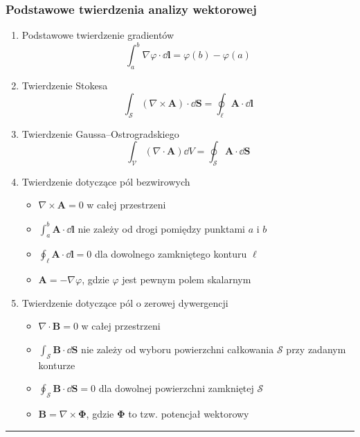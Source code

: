 \documentclass[../main.tex]{subfiles}
\begin{document}
\subsubsection*{Podstawowe twierdzenia analizy wektorowej}
\begin{enumerate}
    \item Podstawowe twierdzenie gradientów
    \begin{equation*}
        \int_a^b\nabla\varphi\cdot\dd{\mathbf{l}}=\varphi(b)-\varphi(a)
    \end{equation*}
    
    \item Twierdzenie Stokesa
    \begin{equation*}
        \int_\mathcal{S}(\nabla\times\mathbf{A})\cdot \dd{\mathbf{S}}=\oint_\ell \mathbf{A}\cdot\dd{\mathbf{l}}
    \end{equation*}
    
    \item Twierdzenie Gaussa--Ostrogradskiego
    \begin{equation*}
        \int_\mathcal{V}(\nabla\cdot \mathbf{A})\dd{V}=\oint_\mathcal{S}\mathbf{A}\cdot\dd{\mathbf{S}}
    \end{equation*}
    
    \item Twierdzenie dotyczące pól bezwirowych
    \begin{itemize}
        \item \(\nabla\times\mathbf{A}=0\) w całej przestrzeni
        \item \(\int_a^b\mathbf{A}\cdot\dd{\mathbf{l}}\) nie zależy od drogi pomiędzy punktami \(a\)
        i \(b\)
        \item \(\oint_\ell \mathbf{A}\cdot\dd{\mathbf{l}}=0\) dla dowolnego zamkniętego konturu
        \(\ell\)
        \item \(\mathbf{A}=-\nabla\varphi\), gdzie \(\varphi\) jest pewnym polem skalarnym
    \end{itemize}
    \item Twierdzenie dotyczące pól o zerowej dywergencji
    \begin{itemize}
        \item \(\nabla\cdot \mathbf{B}=0\) w całej przestrzeni
        \item \(\int_\mathcal{S}\mathbf{B}\cdot\dd{\mathbf{S}}\) nie zależy od wyboru powierzchni
        całkowania \(\mathcal{S}\) przy zadanym konturze
        \item \(\oint_\mathcal{S}\mathbf{B}\cdot\dd{\mathbf{S}}=0\) dla dowolnej powierzchni
        zamkniętej \(\mathcal{S}\)
        \item \(\mathbf{B}=\nabla\times\boldsymbol{\Phi}\), gdzie \(\boldsymbol{\Phi}\) to tzw.
        potencjał wektorowy
    \end{itemize}
\end{enumerate}
\noindent\rule{\textwidth}{.5pt}
\end{document}
